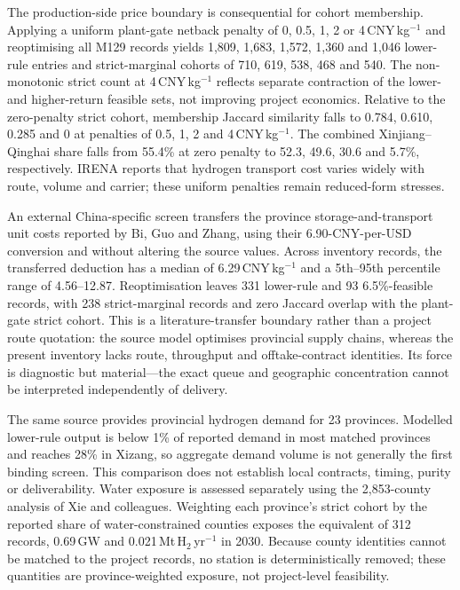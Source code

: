 \documentclass[11pt,a4paper]{article}
\begin{document}
The production-side price boundary is consequential for cohort membership. Applying a uniform plant-gate netback penalty of 0, 0.5, 1, 2 or 4\,CNY\,kg$^{-1}$ and reoptimising all M129 records yields 1,809, 1,683, 1,572, 1,360 and 1,046 lower-rule entries and strict-marginal cohorts of 710, 619, 538, 468 and 540. The non-monotonic strict count at 4\,CNY\,kg$^{-1}$ reflects separate contraction of the lower- and higher-return feasible sets, not improving project economics. Relative to the zero-penalty strict cohort, membership Jaccard similarity falls to 0.784, 0.610, 0.285 and 0 at penalties of 0.5, 1, 2 and 4\,CNY\,kg$^{-1}$. The combined Xinjiang--Qinghai share falls from 55.4\% at zero penalty to 52.3, 49.6, 30.6 and 5.7\%, respectively. IRENA reports that hydrogen transport cost varies widely with route, volume and carrier; these uniform penalties remain reduced-form stresses\cite{irenatransport2022}.

An external China-specific screen transfers the province storage-and-transport unit costs reported by Bi, Guo and Zhang, using their 6.90-CNY-per-USD conversion and without altering the source values\cite{bi2026}. Across inventory records, the transferred deduction has a median of 6.29\,CNY\,kg$^{-1}$ and a 5th--95th percentile range of 4.56--12.87. Reoptimisation leaves 331 lower-rule and 93 6.5\%-feasible records, with 238 strict-marginal records and zero Jaccard overlap with the plant-gate strict cohort. This is a literature-transfer boundary rather than a project route quotation: the source model optimises provincial supply chains, whereas the present inventory lacks route, throughput and offtake-contract identities. Its force is diagnostic but material---the exact queue and geographic concentration cannot be interpreted independently of delivery.

The same source provides provincial hydrogen demand for 23 provinces. Modelled lower-rule output is below 1\% of reported demand in most matched provinces and reaches 28\% in Xizang, so aggregate demand volume is not generally the first binding screen. This comparison does not establish local contracts, timing, purity or deliverability. Water exposure is assessed separately using the 2,853-county analysis of Xie and colleagues\cite{xie2026}. Weighting each province's strict cohort by the reported share of water-constrained counties exposes the equivalent of 312 records, 0.69\,GW and 0.021\,Mt\,H$_2$\,yr$^{-1}$ in 2030. Because county identities cannot be matched to the project records, no station is deterministically removed; these quantities are province-weighted exposure, not project-level feasibility.
\end{document}

